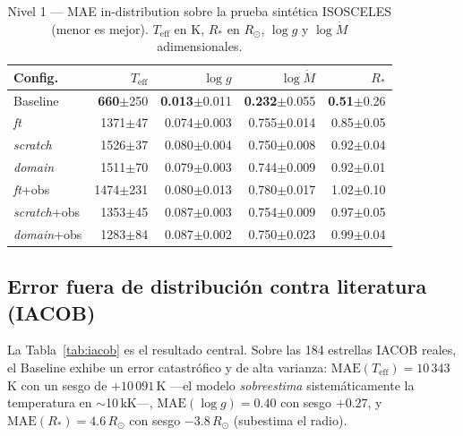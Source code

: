 \documentclass[sigconf,ACM]{acmart}
\begin{document}
\begin{table}[htbp]
  \caption{Nivel 1 --- MAE in-distribution sobre la prueba sintética ISOSCELES
  (menor es mejor). $T_\mathrm{eff}$ en K, $R_*$ en $R_\odot$,
  $\log g$ y $\log\dot{M}$ adimensionales.}
  \label{tab:iso}
  \scriptsize
  \setlength{\tabcolsep}{3pt}
  \begin{tabular}{lrrrr}
    \toprule
    Config. & $T_\mathrm{eff}$ & $\log g$ & $\log\dot{M}$ & $R_*$ \\
    \midrule
    Baseline          & \textbf{660}$\pm$250 & \textbf{0.013}$\pm$0.011 & \textbf{0.232}$\pm$0.055 & \textbf{0.51}$\pm$0.26 \\
    \emph{ft}         & 1371$\pm$47  & 0.074$\pm$0.003 & 0.755$\pm$0.014 & 0.85$\pm$0.05 \\
    \emph{scratch}    & 1526$\pm$37  & 0.080$\pm$0.004 & 0.750$\pm$0.008 & 0.92$\pm$0.04 \\
    \emph{domain}     & 1511$\pm$70  & 0.079$\pm$0.003 & 0.744$\pm$0.009 & 0.92$\pm$0.01 \\
    \emph{ft}+obs     & 1474$\pm$231 & 0.080$\pm$0.013 & 0.780$\pm$0.017 & 1.02$\pm$0.10 \\
    \emph{scratch}+obs& 1353$\pm$45  & 0.087$\pm$0.003 & 0.754$\pm$0.009 & 0.97$\pm$0.05 \\
    \emph{domain}+obs & 1283$\pm$84  & 0.087$\pm$0.002 & 0.750$\pm$0.023 & 0.99$\pm$0.04 \\
    \bottomrule
  \end{tabular}
\end{table}

\subsection{Error fuera de distribución contra literatura (IACOB)}

La Tabla~\ref{tab:iacob} es el resultado central. Sobre las 184 estrellas IACOB
reales, el Baseline exhibe un error catastrófico y de alta varianza:
$\mathrm{MAE}(T_\mathrm{eff})=10\,343$\,K con un sesgo de
$+10\,091$\,K ---el modelo \emph{sobreestima} sistemáticamente la temperatura en
$\sim$10\,kK---, $\mathrm{MAE}(\log g)=0.40$ con sesgo $+0.27$, y
$\mathrm{MAE}(R_*)=4.6\,R_\odot$ con sesgo $-3.8\,R_\odot$ (subestima el radio).
\end{document}

